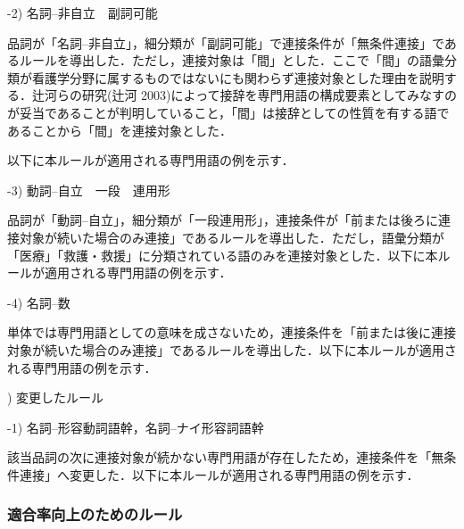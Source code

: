 \documentclass[japanese]{jnlp_1.4}
\begin{document}
-2) 名詞--非自立　副詞可能

品詞が「名詞--非自立」，細分類が「副詞可能」で連接条件が「無条件連接」であるルールを導出した．ただし，連接対象は「間」とした．ここで「間」の語彙分類が看護学分野に属するものではないにも関わらず連接対象とした理由を説明する．辻河らの研究(辻河 2003)によって接辞を専門用語の構成要素としてみなすのが妥当であることが判明していること，「間」は接辞としての性質を有する語であることから「間」を連接対象とした．

以下に本ルールが適用される専門用語の例を示す．

\vspace{1zw}
\vspace{1zw}

-3) 動詞--自立　一段　連用形

品詞が「動詞--自立」，細分類が「一段連用形」，連接条件が「前または後ろに連接対象が続いた場合のみ連接」であるルールを導出した．ただし，語彙分類が「医療」「救護・救援」に分類されている語のみを連接対象とした．以下に本ルールが適用される専門用語の例を示す．

\vspace{1zw}
\vspace{1zw}

-4) 名詞--数

単体では専門用語としての意味を成さないため，連接条件を「前または後に連接対象が続いた場合のみ連接」であるルールを導出した．以下に本ルールが適用される専門用語の例を示す．

\vspace{1zw}
\vspace{1zw}

) 変更したルール

-1) 名詞--形容動詞語幹，名詞--ナイ形容詞語幹

該当品詞の次に連接対象が続かない専門用語が存在したため，連接条件を「無条件連接」へ変更した．以下に本ルールが適用される専門用語の例を示す．

\vspace{1zw}
\vspace{1zw}


\subsubsection{適合率向上のためのルール}
\end{document}
